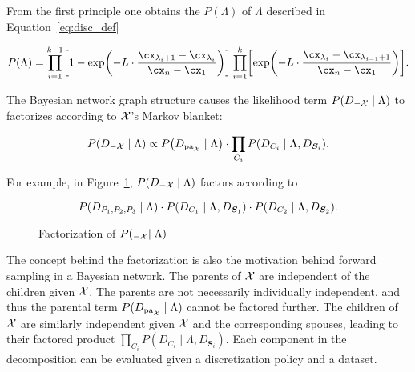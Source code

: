 From the first principle one obtains the $P(\Lambda)$ of $\Lambda$ described in Equation~\ref{eq:disc_def}

\begin{small}
\begin{equation}
  \label{eq:p_M}
  P(\Lambda) = \prod_{i=1}^{k-1}
    \brock{
      1 - \exp\paren{
        - L \cdot \frac{
                         \cx_{\lambda_i +1} - \cx_{\lambda_i}
                       }{
                         \cx_n - \cx_1
                        }
      }
    }
    \prod_{i=1}^{k}
	\brock{
    \exp\paren{
      -L \cdot \frac{\cx_{\lambda_{i}} - \cx_{\lambda_{i-1} + 1}}{\cx_n - \cx_1}}
    }\text{.}
\end{equation}
\end{small}

The Bayesian network graph structure causes the likelihood term $P(D_{-\mathcal{X}} \mid \Lambda)$ to factorizes according to $\mathcal{X}$'s Markov blanket:

\begin{equation}
  \label{eq:p_D_given_M}
  P\paren{D_{-\cX} \mid \Lambda} \propto P\paren{D_{\Pa_\cX} \mid \Lambda} \cdot \prod_{C_i} P\paren{D_{C_i} \mid \Lambda, D_{\bm{S}_i}}\text{.}
\end{equation}

For example, in Figure~\ref{fig:example_factorization}, $P(D_{-\mathcal{X}} \mid \Lambda)$ factors according to

\begin{equation}
  P\paren{D_{P_1,P_2,P_3} \mid \Lambda} \cdot P\paren{ D_{ C_1 } \mid \Lambda, D_{\bm{S}_1} } \cdot P\paren{D_{C_2} \mid \Lambda, D_{\bm{S}_2}}\text{.}
\end{equation}

\begin{figure}[ht]
  \centering
  
  \caption{Factorization of $P(_{-\mathcal{X}} \mid \Lambda)$}
  \label{fig:example_factorization}
\end{figure}

The concept behind the factorization is also the motivation behind forward sampling in a Bayesian network.
The parents of $\mathcal{X}$ are independent of the children given $\mathcal{X}$.
The parents are not necessarily individually independent, and thus the parental term $P(D_{\operatorname{pa}_{\mathcal{X}}} \mid \Lambda)$ cannot be factored further.
The children of $\mathcal{X}$ are similarly independent given $\mathcal{X}$ and the corresponding spouses, leading to their factored product $\prod_{C_i} P(D_{C_i} \mid \Lambda, D_{\bm{S}_i})$.
Each component in the decomposition can be evaluated given a discretization policy and a dataset.

